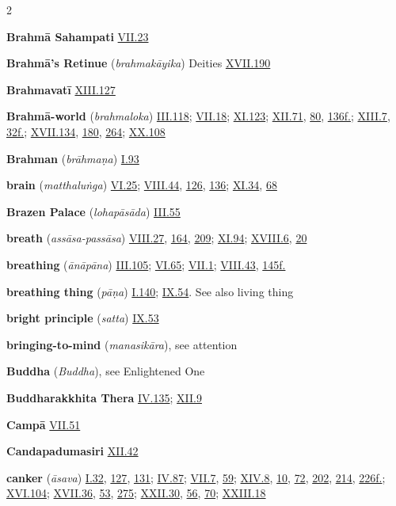 \begin{multicols}{2}
\begin{vismHanging}
\par\textbf{Brahmā Sahampati} \hyperlink{VII.23}{VII.23}{}
\par\textbf{Brahmā’s Retinue} (\emph{brahmakāyika}) Deities \hyperlink{XVII.190}{XVII.190}{}
\par\textbf{Brahmavatī} \hyperlink{XIII.127}{XIII.127}{}
\par\textbf{Brahmā-world} (\emph{brahmaloka}) \hyperlink{III.118}{III.118}{}; \hyperlink{VII.18}{VII.18}{}; \hyperlink{XI.123}{XI.123}{}; \hyperlink{XII.71}{XII.71}{}, \hyperlink{XII.80}{80}{}, \hyperlink{XII.136}{136f.}{}; \hyperlink{XIII.7}{XIII.7}{}, \hyperlink{XIII.32}{32f.}{}; \hyperlink{XVII.134}{XVII.134}{}, \hyperlink{XVII.180}{180}{}, \hyperlink{XVII.264}{264}{}; \hyperlink{XX.108}{XX.108}{}
\par\textbf{Brahman} (\emph{brāhmaṇa}) \hyperlink{I.93}{I.93}{}
\par\textbf{brain} (\emph{matthaluṅga}) \hyperlink{VI.25}{VI.25}{}; \hyperlink{VIII.44}{VIII.44}{}, \hyperlink{VIII.126}{126}{}, \hyperlink{VIII.136}{136}{}; \hyperlink{XI.34}{XI.34}{}, \hyperlink{XI.68}{68}{}
\par\textbf{Brazen Palace} (\emph{lohapāsāda}) \hyperlink{III.55}{III.55}{}
\par\textbf{breath} (\emph{assāsa-passāsa}) \hyperlink{VIII.27}{VIII.27}{}, \hyperlink{VIII.164}{164}{}, \hyperlink{VIII.209}{209}{}; \hyperlink{XI.94}{XI.94}{}; \hyperlink{XVIII.6}{XVIII.6}{}, \hyperlink{XVIII.20}{20}{}
\par\textbf{breathing} (\emph{ānāpāna}) \hyperlink{III.105}{III.105}{}; \hyperlink{VI.65}{VI.65}{}; \hyperlink{VII.1}{VII.1}{}; \hyperlink{VIII.43}{VIII.43}{}, \hyperlink{VIII.145}{145f.}{}
\par\textbf{breathing thing} (\emph{pāṇa}) \hyperlink{I.140}{I.140}{}; \hyperlink{IX.54}{IX.54}{}. See also living thing 
\par\textbf{bright principle} (\emph{satta}) \hyperlink{IX.53}{IX.53}{}
\par\textbf{bringing-to-mind} (\emph{manasikāra}), see attention 
\par\textbf{Buddha} (\emph{Buddha}), see Enlightened One
\par\textbf{Buddharakkhita Thera} \hyperlink{IV.135}{IV.135}{}; \hyperlink{XII.9}{XII.9}{}
\par\textbf{Campā} \hyperlink{VII.51}{VII.51}{}
\par\textbf{Candapadumasiri} \hyperlink{XII.42}{XII.42}{}
\par\textbf{canker} (\emph{āsava}) \hyperlink{I.32}{I.32}{}, \hyperlink{I.127}{127}{}, \hyperlink{I.131}{131}{}; \hyperlink{IV.87}{IV.87}{}; \hyperlink{VII.7}{VII.7}{}, \hyperlink{VII.59}{59}{}; \hyperlink{XIV.8}{XIV.8}{}, \hyperlink{XIV.10}{10}{}, \hyperlink{XIV.72}{72}{}, \hyperlink{XIV.202}{202}{}, \hyperlink{XIV.214}{214}{}, \hyperlink{XIV.226}{226f.}{}; \hyperlink{XVI.104}{XVI.104}{}; \hyperlink{XVII.36}{XVII.36}{}, \hyperlink{XVII.53}{53}{}, \hyperlink{XVII.275}{275}{}; \hyperlink{XXII.30}{XXII.30}{}, \hyperlink{XXII.56}{56}{}, \hyperlink{XXII.70}{70}{}; \hyperlink{XXIII.18}{XXIII.18}{}

\end{vismHanging}
\end{multicols}
